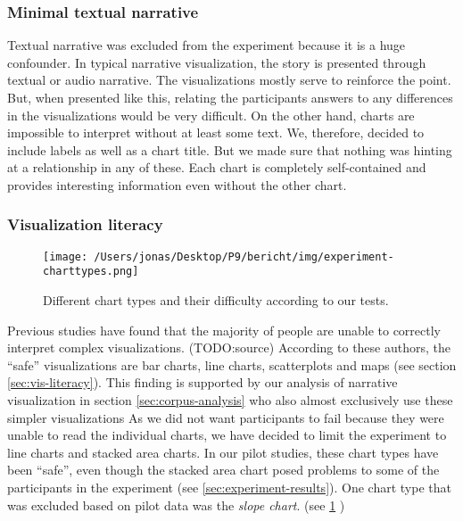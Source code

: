 \begin{flushleft}
\hypertarget{minimal-textual-narrative}{%
\subsubsection{Minimal textual
narrative}\label{minimal-textual-narrative}}

Textual narrative was excluded from the experiment because it is a huge
confounder. In typical narrative visualization, the story is
presented through textual or audio narrative. The visualizations mostly
serve to reinforce the point. But, when presented like this, relating
the participants answers to any differences in the visualizations would
be very difficult. On the other hand, charts are impossible to interpret
without at least some text. We, therefore, decided to include labels as
well as a chart title. But we made sure that nothing was hinting at a
relationship in any of these. Each chart is completely self-contained
and provides interesting information even without the other chart.

\hypertarget{visualization-literacy}{%
\subsubsection{Visualization literacy}\label{visualization-literacy}}

\begin{figure}
\centering
\texttt{[image: /Users/jonas/Desktop/P9/bericht/img/experiment-charttypes.png]}
\caption{Different chart types and their difficulty according to our tests. \label{experiment-charttypes}}
\end{figure}

Previous studies have found that the majority of people are unable to
correctly interpret complex visualizations. (TODO:source) According to
these authors, the ``safe'' visualizations are bar charts, line charts,
scatterplots and maps (see section \ref{sec:vis-literacy}). This finding
is supported by our analysis of narrative visualization in section
\ref{sec:corpus-analysis} who also almost exclusively use these simpler
visualizations As we did not want participants to fail because they were
unable to read the individual charts, we have decided to limit the
experiment to line charts and stacked area charts. In our pilot studies,
these chart types have been ``safe'', even though the stacked area chart
posed problems to some of the participants in the experiment (see
\ref{sec:experiment-results}). One chart type that was excluded based on
pilot data was the \emph{slope chart}. (see \ref{experiment-charttypes}
)


\end{flushleft}
